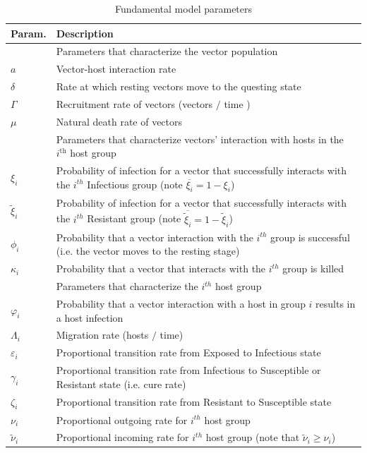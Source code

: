 \documentclass[a4paper]{article}
\newcommand{\bftmp}{ }
\newcommand{\miVar}{\varphi_i}
\begin{document}
\begin{table}[htbp]

\captionsetup{skip=0pt}\caption{Fundamental model parameters}\label{tab.tabvd}

\begin{tabular}{p{1.2cm}p{15.25cm}}
\hline
Param. &  Description\hfill\,  \\
\hline
&\hfill Parameters that characterize the vector population\hfill\,  \\
\hline
$a$ & Vector-host interaction rate  
\\$\delta$ & Rate at which resting vectors move to the questing state
\\$\Gamma$ & Recruitment rate of vectors (vectors $/$ time ) 
\\$\mu$ & Natural death rate of vectors
\\\hline
&\hfill Parameters  that characterize vectors' interaction with hosts in the $i^{\textrm{th}}$ host group\hfill\,  \\
\hline
$\xi_i $ & Probability of infection for a vector that  successfully interacts with the $i^{th}$ Infectious group  (note $\overline{\xi_i} = 1 - \xi_i$)
\\$\widetilde\xi_i $ & Probability of infection for  a vector that  successfully interacts with the $i^{th}$ Resistant group  (note $\overline{\widetilde\xi_i} = 1 - \widetilde\xi_i$)
\\$\phi_i $ & Probability that a vector interaction with  the $i^{th}$ group is successful (i.e. the vector moves to the resting stage) 
\\$\kappa_i $ & Probability that a vector that interacts with the $i^{th}$ group is killed
\\\hline
&\hfill Parameters  that characterize the $i^{th}$ host group\hfill\,  \\
\hline
$\miVar $ & Probability that a vector interaction with a  host in group $i$ results in a host infection
\\$\Lambda_i$ & Migration  rate (hosts $/$ time)  
\\$\varepsilon_i $ & {\bftmp Proportional} transition rate from Exposed to Infectious  state  
\\$\gamma_i$ & {\bftmp Proportional} transition rate from Infectious to Susceptible or Resistant  state (i.e. cure rate)
\\$\zeta_i $ & {\bftmp Proportional} transition rate from Resistant to Susceptible   state 
\\$\nu_i$ & {\bftmp Proportional} outgoing rate for $i^{th}$ host group
\\$\widetilde\nu_i$ & {\bftmp Proportional} incoming rate for $i^{th}$ host group {\bftmp(note that $\widetilde\nu_i \ge \nu_i$)}
\\
\hline
\end{tabular}
\end{table}
\end{document}
